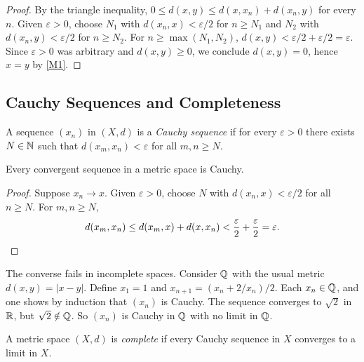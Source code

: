 \documentclass[11pt,a4paper]{article}
\begin{document}
\begin{proof}
By the triangle inequality,
$0 \le d(x,y) \le d(x, x_n) + d(x_n, y)$ for every $n$. Given
$\varepsilon > 0$, choose $N_1$ with $d(x_n, x) < \varepsilon/2$ for
$n \ge N_1$ and $N_2$ with $d(x_n, y) < \varepsilon/2$ for $n \ge N_2$. For
$n \ge \max(N_1, N_2)$,
$d(x,y) < \varepsilon/2 + \varepsilon/2 = \varepsilon$. Since $\varepsilon > 0$
was arbitrary and $d(x,y) \ge 0$, we conclude $d(x,y) = 0$, hence $x = y$ by
\ref{M1}.
\end{proof}

\subsection{Cauchy Sequences and Completeness}
\label{subsec:cauchy}

\begin{definition}
\label{def:cauchy}
A sequence $(x_n)$ in $(X,d)$ is a \emph{Cauchy sequence} if for every
$\varepsilon > 0$ there exists $N \in \mathbb{N}$ such that $d(x_m, x_n) < \varepsilon$
for all $m, n \ge N$.
\end{definition}

\begin{proposition}
\label{prop:conv_cauchy}
Every convergent sequence in a metric space is Cauchy.
\end{proposition}

\begin{proof}
Suppose $x_n \to x$. Given $\varepsilon > 0$, choose $N$ with
$d(x_n, x) < \varepsilon/2$ for all $n \ge N$. For $m, n \ge N$,
\[
d(x_m, x_n) \le d(x_m, x) + d(x, x_n) < \frac{\varepsilon}{2} +
\frac{\varepsilon}{2} = \varepsilon. \qedhere
\]
\end{proof}

\begin{warning}[title={Cauchy Does Not Imply Convergent}]
The converse fails in incomplete spaces. Consider $\mathbb{Q}$ with the usual metric
$d(x,y) = |x - y|$. Define $x_1 = 1$ and $x_{n+1} = (x_n + 2/x_n)/2$.
Each $x_n \in \mathbb{Q}$, and one shows by induction that $(x_n)$ is Cauchy. The
sequence converges to $\sqrt{2}$ in $\mathbb{R}$, but $\sqrt{2} \notin \mathbb{Q}$. So
$(x_n)$ is Cauchy in $\mathbb{Q}$ with no limit in $\mathbb{Q}$.
\end{warning}

\begin{definition}
\label{def:complete}
A metric space $(X,d)$ is \emph{complete} if every Cauchy sequence in $X$
converges to a limit in $X$.
\end{definition}
\end{document}
